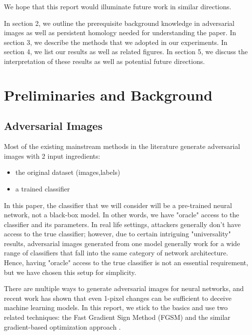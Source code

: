 \documentclass[twoside,twocolumn]{article}
\begin{document}
We hope that this report would illuminate future work in similar directions. 

In section 2, we outline the prerequisite background knowledge in adversarial images as well as persistent homology needed for understanding the paper. In section 3, we describe the methods that we adopted in our experiments. In section 4, we list our results as well as related figures. In section 5, we discuss the interpretation of these results as well as potential future directions. 


\section{Preliminaries and Background}

\subsection{Adversarial Images}

Most of the existing mainstream methods in the literature generate adversarial images with 2 input ingredients: 
\begin{itemize}
    \item the original dataset (images,labels)
    \item a trained classifier
\end{itemize}
In this paper, the classifier that we will consider will be a pre-trained neural network, not a black-box model. In other words, we have "oracle" access to the classifier and its parameters. In real life settings, attackers generally don't have access to the true classifier; however, due to certain intriguing "universality" results, adversarial images generated from one model generally work for a wide range of classifiers that fall into the same category of network architecture. Hence, having "oracle" access to the true classifier is not an essential requirement, but we have chosen this setup for simplicity. 

There are multiple ways to generate adversarial images for neural networks, and recent work has shown that even 1-pixel changes can be sufficient to deceive machine learning models. In this report, we stick to the basics and use two related techniques: the Fast Gradient Sign Method (FGSM) \cite{goodfellow2014} and the similar gradient-based optimization approach \cite{szegedy2013}.
\end{document}
